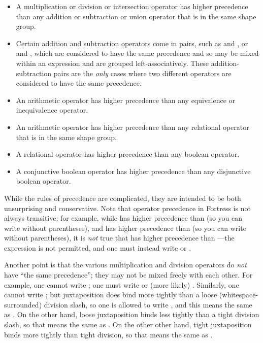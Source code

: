 \begin{itemize}
\item
A multiplication or division or intersection operator has higher precedence than any addition or subtraction or union
operator that is in the same shape group.

\item Certain addition and subtraction operators come in pairs,
such as \EXP{+} and \EXP{-}, or \EXP{\oplus} and \EXP{\ominus},
 which are considered to have the
same precedence and so may be mixed within an expression and are grouped
left-associatively.  These addition-subtraction pairs are the \emph{only}
cases where two different operators are considered to have the same precedence.

\item An arithmetic operator has higher precedence than any equivalence or inequivalence operator.

\item An arithmetic operator has higher precedence than any relational operator that is in the same shape group.

\item A relational operator has higher precedence than any boolean operator.

\item A conjunctive boolean operator has higher precedence than any disjunctive boolean operator.
\end{itemize}

While the rules of precedence are complicated, they
are intended to be both unsurprising and conservative.
Note that operator precedence in Fortress is not always transitive;
for example,  while \EXP{+} has higher precedence than \EXP{<}
(so you can write  without parentheses), and \EXP{<} has higher precedence than
\EXP{\vee} (so you can write  without
parentheses), it is \emph{not} true
that \EXP{+} has higher precedence than \EXP{\vee}---the expression
 is not permitted,
and one must instead write  or .

Another point is that the various multiplication and division operators
do \emph{not} have ``the same precedence''; they may not be mixed freely with each other.
For example, one cannot write
;
one must write  or (more likely)
.
Similarly, one cannot write
;
but juxtaposition
does bind more tightly than a loose (whitespace-surrounded) division
slash, so one is allowed to write , and this means the
same as .
On the other hand, loose juxtaposition binds less tightly than a tight
division slash,
so that  means the same as .  On the other
other hand,
tight juxtaposition binds more tightly than tight division, so that
means the same as .

